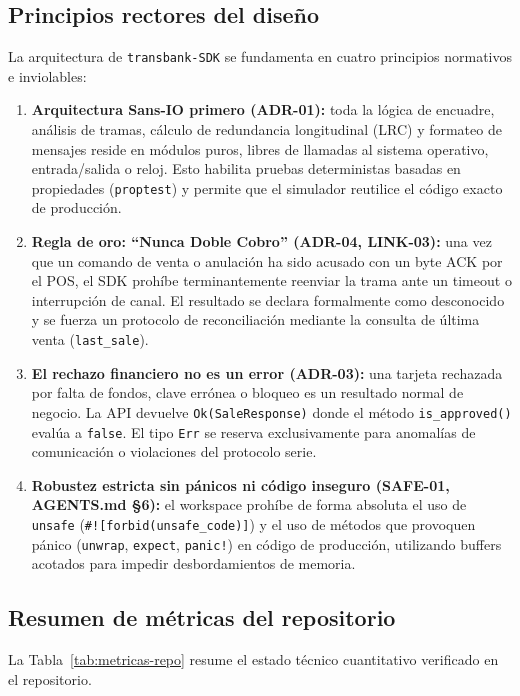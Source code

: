 \documentclass{../../plantilla/raysac-informe}
\begin{document}
\subsection{Principios rectores del diseño}
La arquitectura de \texttt{transbank-SDK} se fundamenta en cuatro principios normativos e inviolables:
\begin{enumerate}
  \item \textbf{Arquitectura Sans-IO primero (ADR-01):} toda la lógica de encuadre, análisis de tramas,
    cálculo de redundancia longitudinal (LRC) y formateo de mensajes reside en módulos puros, libres de
    llamadas al sistema operativo, entrada/salida o reloj. Esto habilita pruebas deterministas basadas en
    propiedades (\texttt{proptest}) y permite que el simulador reutilice el código exacto de producción.
  \item \textbf{Regla de oro: ``Nunca Doble Cobro'' (ADR-04, LINK-03):} una vez que un comando de venta o
    anulación ha sido acusado con un byte ACK por el POS, el SDK prohíbe terminantemente reenviar la trama
    ante un timeout o interrupción de canal. El resultado se declara formalmente como desconocido y se
    fuerza un protocolo de reconciliación mediante la consulta de última venta (\texttt{last\_sale}).
  \item \textbf{El rechazo financiero no es un error (ADR-03):} una tarjeta rechazada por falta de fondos,
    clave errónea o bloqueo es un resultado normal de negocio. La API devuelve \texttt{Ok(SaleResponse)}
    donde el método \texttt{is\_approved()} evalúa a \texttt{false}. El tipo \texttt{Err} se reserva
    exclusivamente para anomalías de comunicación o violaciones del protocolo serie.
  \item \textbf{Robustez estricta sin pánicos ni código inseguro (SAFE-01, AGENTS.md §6):} el workspace
    prohíbe de forma absoluta el uso de \texttt{unsafe} (\texttt{\#![forbid(unsafe\_code)]}) y el uso de
    métodos que provoquen pánico (\texttt{unwrap}, \texttt{expect}, \texttt{panic!}) en código de producción,
    utilizando buffers acotados para impedir desbordamientos de memoria.
\end{enumerate}

\subsection{Resumen de métricas del repositorio}
La Tabla~\ref{tab:metricas-repo} resume el estado técnico cuantitativo verificado en el repositorio.
\end{document}
